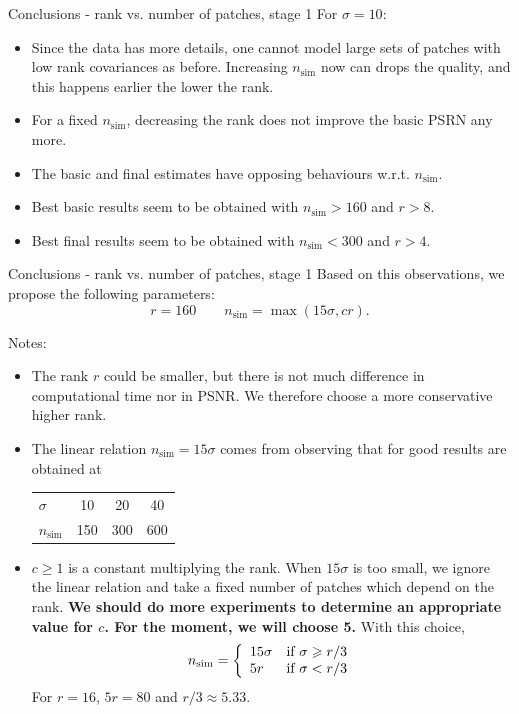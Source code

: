 \documentclass[mathserif, 8pt]{beamer}
\makeatletter
\newcounter{multipleslide}
\newcommand{\restoreframe}{%
\patchcmd{\beamer@@tmpl@footline}%
	{\themultipleslide}%
	{\insertframenumber}%
	{}%
	{}%
\setcounter{framenumber}{\value{multipleslide}}%
}
\makeatother
\begin{document}
\begin{frame}{Conclusions - rank vs. number of patches, stage 1}
	For $\sigma = 10$:
	\begin{itemize}\itemsep=.3cm
		\item Since the data has more details, one cannot model large sets of patches
			with low rank covariances as before. Increasing $n_{\text{sim}}$ now can drops
			the quality, and this happens earlier the lower the rank.
		\item For a fixed $n_{\text{sim}}$, decreasing the rank does not
			improve the basic PSRN any more.
		\item The basic and final estimates have opposing behaviours w.r.t. $n_{\text{sim}}$.
		\item Best basic results seem to be obtained with $n_{\text{sim}} > 
			160$ and $r > 8$.
		\item Best final results seem to be obtained with $n_{\text{sim}}<
			300$ and $r > 4$.
	\end{itemize}
\end{frame}

\begin{frame}{Conclusions - rank vs. number of patches, stage 1}
	Based on this observations, we propose the following parameters:
	\[r = 160\quad\quad n_{\text{sim}} = \max(15\sigma,cr).\]

	Notes:
	\begin{itemize}\itemsep=.3cm
		\item The rank $r$ could be smaller, but there is not much difference in
			computational time nor in PSNR. We therefore choose a more
			conservative higher rank.
		\item The linear relation $n_{\text{sim}} = 15\sigma$ comes from observing that
			for good results are obtained at
			\begin{center}
				\begin{tabular}{l | c c c}
					$\sigma$         &  10 &  20 &  40 \\ 
					$n_{\text{sim}}$ & 150 & 300 & 600 
				\end{tabular}
			\end{center}
		\item $c\geqslant1$ is a constant multiplying the rank. When $15\sigma$
			is too small, we ignore the linear relation and take a fixed number of
			patches which depend on the rank. \textbf{We should do more experiments
			to determine an appropriate value for $c$. For the moment, we will choose
         5.} With this choice,
			\[
				n_{\text{sim}} =
				\left\{
				\begin{array}{l l}
					15\sigma & \text{if }\sigma \geqslant r/3\\
					5r       & \text{if }\sigma < r/3
				\end{array}
				\right.
			\]
			For $r = 16$, $5r = 80$ and $r/3 \approx 5.33$.
	\end{itemize}
\end{frame}


\restoreframe
\end{document}
